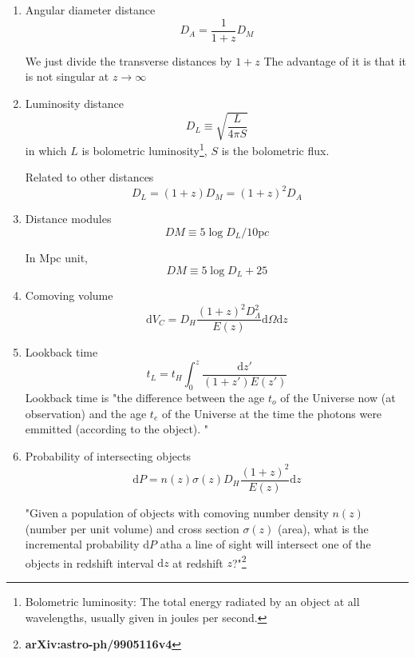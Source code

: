 \documentclass[12pt,a4paper]{book}
\begin{document}
\begin{enumerate}
\item
Angular diameter distance
\begin{equation}
	D_A = \frac {1}{1+z} D_M
\end{equation}

We just divide the transverse distances by $1+z$
The advantage of it is that it is not singular at $z\rightarrow\infty$

\item
Luminosity distance
\begin{equation}
	D_L\equiv \sqrt{\frac{L}{4\pi S}}
\end{equation}
in which $L$ is bolometric luminosity\footnote{Bolometric luminosity: The total energy radiated by an object at all wavelengths, usually given in joules per second.}, $S$ is the bolometric flux.

Related to other distances
\begin{equation}
	D_L = (1+z)D_M = (1+z)^2 D_A
\end{equation}

\item
Distance modules
\begin{equation}
	DM \equiv 5 \log{D_L/10\mathrm pc}
\end{equation}

In Mpc unit,
\begin{equation}
	DM \equiv 5 \log{D_L} + 25
\end{equation}

\item
Comoving volume
\begin{equation}
	\mathrm dV_C = D_H \frac{(1+z)^2D_\Lambda^2}{E(z)}\mathrm d\Omega \mathrm dz
\end{equation}

\item
Lookback time
\begin{equation}
	t_L = t_H \int_0^z \frac{\mathrm dz'}{(1+z')E(z')}
\end{equation}
Lookback time is "the difference between the age $t_o$ of the Universe now (at observation) and the age $t_e$ of the Universe at the time the photons were emmitted (according to the object). "

\item
Probability of intersecting objects
\begin{equation}
	\mathrm dP = n(z)\sigma(z)D_H\frac{(1+z)^2}{E(z)}\mathrm dz
\end{equation}

"Given a population of objects with comoving number density $n(z)$ (number per unit volume) and cross section $\sigma(z)$ (area), what is the incremental probability $\mathrm dP$ atha a line of sight will intersect one of the objects in redshift interval $\mathrm dz$ at redshift $z$?"\footnote{{\bf arXiv:astro-ph/9905116v4}}


\end{enumerate}
\end{document}
